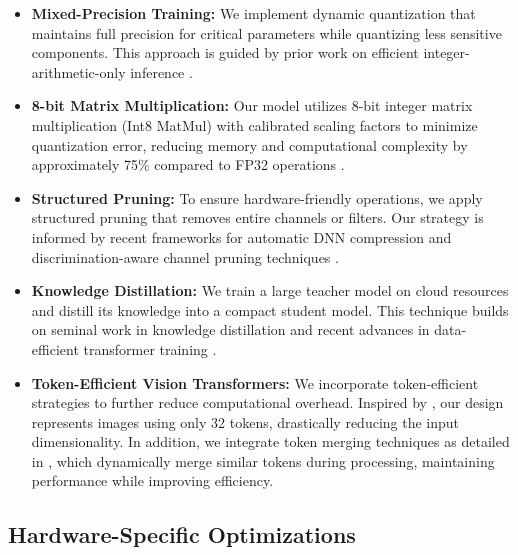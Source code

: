 \documentclass[11pt, oneside]{article}   	%
\begin{document}
\begin{itemize}
	\item \textbf{Mixed-Precision Training:} We implement dynamic quantization that maintains full precision for critical parameters while quantizing less sensitive components. This approach is guided by prior work on efficient integer-arithmetic-only inference \cite{jacob2017quantizationtrainingneuralnetworks}.

	\item \textbf{8-bit Matrix Multiplication:} Our model utilizes 8-bit integer matrix multiplication (Int8 MatMul) with calibrated scaling factors to minimize quantization error, reducing memory and computational complexity by approximately 75\% compared to FP32 operations \cite{jacob2017quantizationtrainingneuralnetworks}.

	\item \textbf{Structured Pruning:} To ensure hardware-friendly operations, we apply structured pruning that removes entire channels or filters. Our strategy is informed by recent frameworks for automatic DNN compression \cite{liu2019autocompressautomaticdnnstructured} and discrimination-aware channel pruning techniques \cite{zhuang2019discriminationawarechannelpruningdeep}.

	\item \textbf{Knowledge Distillation:} We train a large teacher model on cloud resources and distill its knowledge into a compact student model. This technique builds on seminal work in knowledge distillation \cite{hinton2015distillingknowledgeneuralnetwork} and recent advances in data-efficient transformer training \cite{touvron2021trainingdataefficientimagetransformers}.

	\item \textbf{Token-Efficient Vision Transformers:} We incorporate token-efficient strategies to further reduce computational overhead. Inspired by \cite{yu2024imageworth32tokens}, our design represents images using only 32 tokens, drastically reducing the input dimensionality. In addition, we integrate token merging techniques as detailed in \cite{bolya2023tokenmergingvitfaster}, which dynamically merge similar tokens during processing, maintaining performance while improving efficiency.
\end{itemize}

\subsection*{Hardware-Specific Optimizations}
\end{document}
